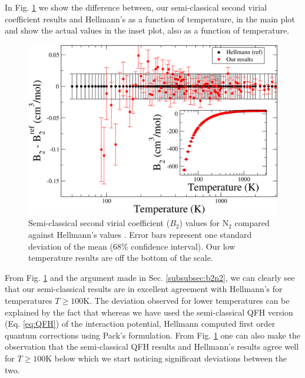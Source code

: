         In Fig. \ref{fig:B2SCN2} we show the difference between, our semi-classical second virial coefficient results and Hellmann's as a function of temperature, in the main plot and show the actual values in the inset plot, also as a function of temperature.
        \begin{figure}[!htbp]
            \centering
            \includegraphics[scale=0.20,keepaspectratio]{Chapter-5/Figures/B2N2SC9sResults.png}
            \caption{Semi-classical second virial coefficient ($B_2$) values for N$_2$ compared against Hellmann's values \cite{Hellmann2013}. Error bars represent one standard deviation of the mean (68\% confidence interval). Our low temperature results are off the bottom of the scale.}
            \label{fig:B2SCN2}
        \end{figure}
        From Fig. \ref{fig:B2SCN2} and the argument made in Sec. \ref{subsubsec:b2n2}, we can clearly see that our semi-classical results are in excellent agreement with Hellmann's for temperatures $T \ge 100$K. The deviation observed for lower temperatures can be explained by the fact that whereas we have used the semi-classical QFH version (Eq. \eqref{eq:QFH}) of the interaction potential, Hellmann computed first order quantum corrections using Pack's \cite{Pack1983} formulation. From Fig. \ref{fig:B2SCN2} one can also make the observation that the semi-classical QFH results and Hellmann's results agree well for $T \ge 100$K below which we start noticing significant deviations between the two.

